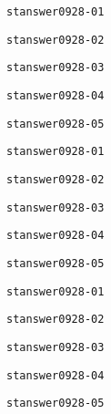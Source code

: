 \documentclass[11pt,dvipdfmx]{ujarticle}
\begin{document}
\begin{center}
\verb|stanswer0928-01|\\
\end{center}
\newpage
\begin{center}
\verb|stanswer0928-02|\\
\end{center}
\newpage
\begin{center}
\verb|stanswer0928-03|\\
\end{center}
\newpage
\begin{center}
\verb|stanswer0928-04|\\
\end{center}
\newpage
\begin{center}
\verb|stanswer0928-05|\\
\end{center}
\newpage
\begin{center}
\verb|stanswer0928-01|\\
\end{center}
\newpage
\begin{center}
\verb|stanswer0928-02|\\
\end{center}
\newpage
\begin{center}
\verb|stanswer0928-03|\\
\end{center}
\newpage
\begin{center}
\verb|stanswer0928-04|\\
\end{center}
\newpage
\begin{center}
\verb|stanswer0928-05|\\
\end{center}
\newpage
\begin{center}
\verb|stanswer0928-01|\\
\end{center}
\newpage
\begin{center}
\verb|stanswer0928-02|\\
\end{center}
\newpage
\begin{center}
\verb|stanswer0928-03|\\
\end{center}
\newpage
\begin{center}
\verb|stanswer0928-04|\\
\end{center}
\newpage
\begin{center}
\verb|stanswer0928-05|\\
\end{center}
\end{document}
